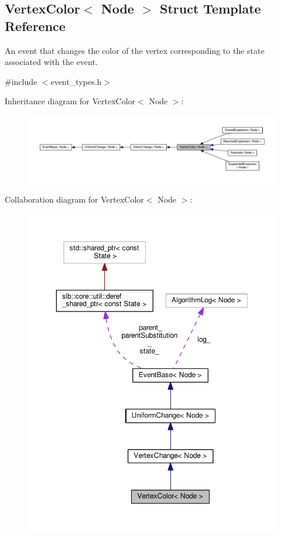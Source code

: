 \hypertarget{structVertexColor}{}\subsection{Vertex\+Color$<$ Node $>$ Struct Template Reference}
\label{structVertexColor}


An event that changes the color of the vertex corresponding to the state associated with the event.  




{\ttfamily \#include $<$event\+\_\+types.\+h$>$}



Inheritance diagram for Vertex\+Color$<$ Node $>$\+:\nopagebreak
\begin{figure}[H]
\begin{center}
\leavevmode
\includegraphics[width=350pt]{structVertexColor__inherit__graph}
\end{center}
\end{figure}


Collaboration diagram for Vertex\+Color$<$ Node $>$\+:\nopagebreak
\begin{figure}[H]
\begin{center}
\leavevmode
\includegraphics[width=350pt]{structVertexColor__coll__graph}
\end{center}
\end{figure}
